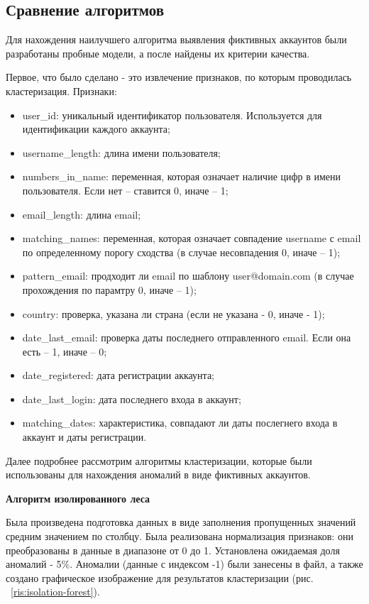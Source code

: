 \vspace{1.5em}
\subsection{Сравнение алгоритмов}
\label{subsec:Algoritm}
Для нахождения наилучшего алгоритма выявления фиктивных аккаунтов были разработаны пробные модели, а после найдены их критерии качества. 

Первое, что было сделано - это извлечение признаков, по которым проводилась кластеризация. Признаки:
\begin{itemize}
    \item user\_id: уникальный идентификатор пользователя. Используется для идентификации каждого аккаунта;
    \item username\_length: длина имени пользователя;
    \item numbers\_in\_name: переменная, которая означает наличие цифр в имени пользователя. Если нет – ставится 0, иначе – 1;
    \item email\_length: длина email;
    \item matching\_names: переменная, которая означает совпадение username с email по определенному порогу сходства (в случае несовпадения 0, иначе – 1);
    \item pattern\_email: продходит ли email по шаблону user@domain.com (в случае прохождения по парамтру 0, иначе – 1);
    \item country: проверка, указана ли страна (если не указана - 0, иначе - 1);
    \item date\_last\_email: проверка даты последнего отправленного email. Если она есть – 1, иначе – 0;
    \item date\_registered: дата регистрации аккаунта;
    \item date\_last\_login: дата последнего входа в аккаунт;
    \item matching\_dates: характеристика, совпадают ли даты послегнего входа в аккаунт и даты регистрации.
\end{itemize}

Далее подробнее рассмотрим алгоритмы кластеризации, которые были использованы для нахождения аномалий в виде фиктивных аккаунтов. 

\vspace{1.5em}
\textbf{Алгоритм изолированного леса}

Была произведена подготовка данных в виде заполнения пропущенных значений средним значением по столбцу. Была реализована нормализация признаков: они преобразованы в данные в диапазоне от 0 до 1. Установлена ожидаемая доля аномалий - 5\%.
Аномалии (данные с индексом -1) были занесены в файл, а также создано графическое изображение для результатов кластеризации (рис. ~\ref{ris:isolation-forest}).


